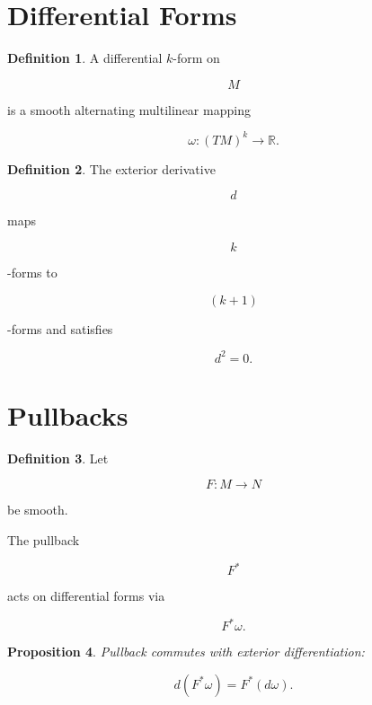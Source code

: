 \documentclass[11pt]{book}
\numberwithin{equation}{chapter}
\theoremstyle{definition}
\newtheorem{definition}{Definition}[chapter]
\theoremstyle{plain}
\newtheorem{proposition}[definition]{Proposition}
\begin{document}

\section{Differential Forms}

\begin{definition}

A differential \(k\)-form on

\[
M
\]

is a smooth alternating multilinear mapping

\[
\omega
:
(TM)^k
\rightarrow
\mathbb{R}.
\]

\end{definition}


\begin{definition}

The exterior derivative

\[
d
\]

maps

\[
k
\]

-forms to

\[
(k+1)
\]

-forms and satisfies

\[
d^2=0.
\]

\end{definition}


\section{Pullbacks}

\begin{definition}

Let

\[
F:M\rightarrow N
\]

be smooth.

The pullback

\[
F^*
\]

acts on differential forms via

\[
F^*\omega.
\]

\end{definition}


\begin{proposition}

Pullback commutes with exterior differentiation:

\[
d(F^*\omega)
=
F^*(d\omega).
\]

\end{proposition}
\end{document}
